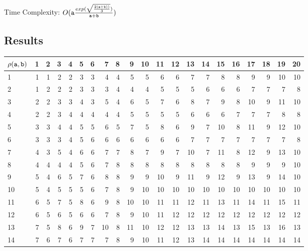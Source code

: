 Time Complexity: $O(\mathtt{a}\frac{exp(\sqrt{\frac{2(\mathtt{a}+\mathtt{b}))}{3} } )}{\mathtt{a}+\mathtt{b}})$

\pagebreak
\subsection{Results}
\begin{tabular}{l|rrrrrrrrrrrrrrrrrrrr}
 $\rho(\mathtt{a},\mathtt{b})$ &  1 & 2 &  3 & 4 &  5 & 6 &  7 &  8 &  9 & 10 & 11 & 12 & 13 & 14 & 15 & 16 & 17 & 18 & 19 & 20 \\
\hline
 1        &  1 & 1 &  2 & 2 &  3 & 3 &  4 &  4 &  5 &  5 &  6 &  6 &  7 &  7 &  8 &  8 &  9 &  9 & 10 & 10 \\
 2        &  1 & 2 &  2 & 2 &  3 & 3 &  3 &  4 &  4 &  4 &  5 &  5 &  5 &  6 &  6 &  6 &  7 &  7 &  7 &  8 \\
 3        &  2 & 2 &  3 & 3 &  4 & 3 &  5 &  4 &  6 &  5 &  7 &  6 &  8 &  7 &  9 &  8 & 10 &  9 & 11 & 10 \\
 4        &  2 & 2 &  3 & 4 &  4 & 4 &  4 &  4 &  5 &  5 &  5 &  5 &  6 &  6 &  6 &  7 &  7 &  7 &  8 &  8 \\
 5        &  3 & 3 &  4 & 4 &  5 & 5 &  6 &  5 &  7 &  5 &  8 &  6 &  9 &  7 & 10 &  8 & 11 &  9 & 12 & 10 \\
 6        &  3 & 3 &  3 & 4 &  5 & 6 &  6 &  6 &  6 &  6 &  6 &  6 &  7 &  7 &  7 &  7 &  7 &  7 &  7 &  8 \\
 7        &  4 & 3 &  5 & 4 &  6 & 6 &  7 &  7 &  8 &  7 &  9 &  7 & 10 &  7 & 11 &  8 & 12 &  9 & 13 & 10 \\
 8        &  4 & 4 &  4 & 4 &  5 & 6 &  7 &  8 &  8 &  8 &  8 &  8 &  8 &  8 &  8 &  8 &  9 &  9 &  9 & 10 \\
 9        &  5 & 4 &  6 & 5 &  7 & 6 &  8 &  8 &  9 &  9 & 10 &  9 & 11 &  9 & 12 &  9 & 13 &  9 & 14 & 10 \\
 10       &  5 & 4 &  5 & 5 &  5 & 6 &  7 &  8 &  9 & 10 & 10 & 10 & 10 & 10 & 10 & 10 & 10 & 10 & 10 & 10 \\
 11       &  6 & 5 &  7 & 5 &  8 & 6 &  9 &  8 & 10 & 10 & 11 & 11 & 12 & 11 & 13 & 11 & 14 & 11 & 15 & 11 \\
 12       &  6 & 5 &  6 & 5 &  6 & 6 &  7 &  8 &  9 & 10 & 11 & 12 & 12 & 12 & 12 & 12 & 12 & 12 & 12 & 12 \\
 13       &  7 & 5 &  8 & 6 &  9 & 7 & 10 &  8 & 11 & 10 & 12 & 12 & 13 & 13 & 14 & 13 & 15 & 13 & 16 & 13 \\
 14       &  7 & 6 &  7 & 6 &  7 & 7 &  7 &  8 &  9 & 10 & 11 & 12 & 13 & 14 & 14 & 14 & 14 & 14 & 14 & 14 \\

\end{tabular}
